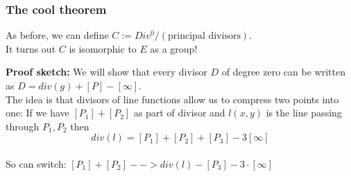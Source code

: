\documentclass[shadesubsections,compress,14pt,mathserif]{beamer}
\newcommand{\defeq}{\ensuremath{:=}}
\begin{document}
\begin{frame}
\frametitle{The cool theorem}
As before, we can define $C\defeq Div^0/(\textrm{principal divisors})$.\\ \pause
\vspace{0.2in}
It turns out $C$ is isomorphic to $E$ as a group!\\ \pause
\vspace{0.2in}
\end{frame}
\begin{frame}
\textbf{Proof sketch:}
We will show that every divisor $D$ of degree zero 
can be written as $D= div(g)+ [P]-[\infty]$.\\ \pause
\vspace{0.2in}
The idea is that divisors of line functions allow us to compress two points into one:
If we have $[P_1]+[P_2]$ as part of divisor
and $l(x,y)$ is the line passing through $P_1,P_2$
then 
$$div(l)=[P_1]+[P_2]+[P_3]-3[\infty]$$\\ \pause
So can switch: $[P_1]+[P_2]--> div(l)-[P_3]-3\cdot [\infty]$




\end{frame}
\end{document}
